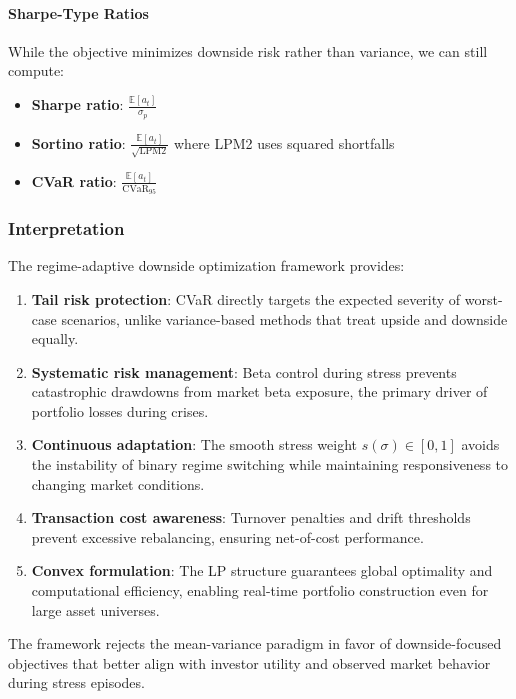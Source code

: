 \paragraph{Sharpe-Type Ratios}

While the objective minimizes downside risk rather than variance, we can still compute:
\begin{itemize}
  \item \textbf{Sharpe ratio}: $\frac{\mathbb{E}[a_t]}{\sigma_p}$
  \item \textbf{Sortino ratio}: $\frac{\mathbb{E}[a_t]}{\sqrt{\text{LPM2}}}$ where LPM2 uses squared shortfalls
  \item \textbf{CVaR ratio}: $\frac{\mathbb{E}[a_t]}{\text{CVaR}_{95}}$
\end{itemize}

\subsubsection{Interpretation}

The regime-adaptive downside optimization framework provides:

\begin{enumerate}
  \item \textbf{Tail risk protection}: CVaR directly targets the expected severity of worst-case scenarios, unlike variance-based methods that treat upside and downside equally.

  \item \textbf{Systematic risk management}: Beta control during stress prevents catastrophic drawdowns from market beta exposure, the primary driver of portfolio losses during crises.

  \item \textbf{Continuous adaptation}: The smooth stress weight $s(\sigma) \in [0, 1]$ avoids the instability of binary regime switching while maintaining responsiveness to changing market conditions.

  \item \textbf{Transaction cost awareness}: Turnover penalties and drift thresholds prevent excessive rebalancing, ensuring net-of-cost performance.

  \item \textbf{Convex formulation}: The LP structure guarantees global optimality and computational efficiency, enabling real-time portfolio construction even for large asset universes.
\end{enumerate}

The framework rejects the mean-variance paradigm in favor of downside-focused objectives that better align with investor utility and observed market behavior during stress episodes.

